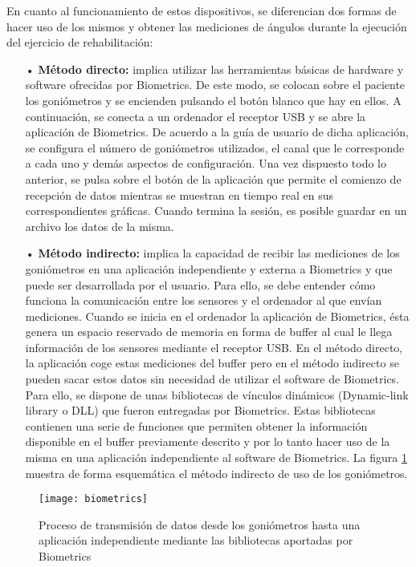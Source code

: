 En cuanto al funcionamiento de estos dispositivos, se diferencian dos formas de hacer uso de los mismos y obtener las mediciones de ángulos durante la ejecución del ejercicio de rehabilitación:
\begin{itemize}
\item[•] \textbf{Método directo:} implica utilizar las herramientas básicas de hardware y software ofrecidas por Biometrics. De este modo, se colocan sobre el paciente los goniómetros y se encienden pulsando el botón blanco que hay en ellos. A continuación, se conecta a un ordenador el receptor USB y se abre la aplicación de Biometrics. De acuerdo a la guía de usuario de dicha aplicación, se configura el número de goniómetros utilizados, el canal que le corresponde a cada uno y demás aspectos de configuración. Una vez dispuesto todo lo anterior, se pulsa sobre el botón de la aplicación que permite el comienzo de recepción de datos mientras se muestran en tiempo real en sus correspondientes gráficas. Cuando termina la sesión, es posible guardar en un archivo los datos de la misma.

\item[•] \textbf{Método indirecto:} implica la capacidad de recibir las mediciones de los goniómetros en una aplicación independiente y externa a Biometrics y que puede ser desarrollada por el usuario. Para ello, se debe entender cómo funciona la comunicación entre los sensores y el ordenador al que envían mediciones. Cuando se inicia en el ordenador la aplicación de Biometrics, ésta genera un espacio reservado de memoria en forma de buffer al cual le llega información de los sensores mediante el receptor USB. En el método directo, la aplicación coge estas mediciones del buffer pero en el método indirecto se pueden sacar estos datos sin necesidad de utilizar el software de Biometrics. Para ello, se dispone de unas bibliotecas de vínculos dinámicos (Dynamic-link library o DLL) que fueron entregadas por Biometrics. Estas bibliotecas contienen una serie de funciones que permiten obtener la información disponible en el buffer previamente descrito y por lo tanto hacer uso de la misma en una aplicación independiente al software de Biometrics. La figura \ref{fig:biometrics} muestra de forma esquemática el método indirecto de uso de los goniómetros.
\end{itemize}

\begin{figure}[!htb]
\centering
\texttt{[image: biometrics]}
  \caption{Proceso de transmisión de datos desde los goniómetros hasta una aplicación independiente mediante las bibliotecas aportadas por Biometrics}\label{fig:biometrics}
\end{figure}

